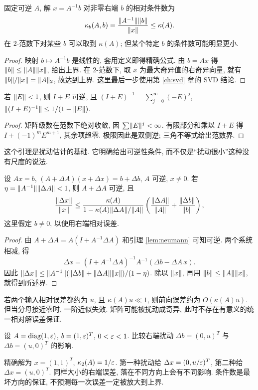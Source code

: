 \begin{proposition}\label{prop:bcondition}
固定可逆 $A$, 解 $x=A^{-1}b$ 对非零右端 $b$ 的相对条件数为
\[
\kappa_b(A,b)=\frac{\lVert A^{-1}\rVert\lVert b\rVert}{\lVert x\rVert}\le\kappa(A).
\]
在 $2$-范数下对某些 $b$ 可以取到 $\kappa(A)$; 但某个特定 $b$ 的条件数可能明显更小.
\end{proposition}
\begin{proof}
映射 $b\mapsto A^{-1}b$ 是线性的, 套用定义即得精确公式. 由 $b=Ax$ 得 $\lVert b\rVert\le\lVert A\rVert\lVert x\rVert$, 给出上界. 在 $2$-范数下, 取 $x$ 为最大奇异值的右奇异向量, 就有 $\lVert b\rVert/\lVert x\rVert=\lVert A\rVert_2$, 故达到上界. 这里最后一步使用第 \ref{ch:svd} 章的 SVD 结论.
\end{proof}
\begin{lemma}[小扰动可逆性]\label{lem:neumann}
若 $\lVert E\rVert<1$, 则 $I+E$ 可逆, 且 $(I+E)^{-1}=\sum_{j=0}^{\infty}(-E)^j$, $\lVert (I+E)^{-1}\rVert\le1/(1-\lVert E\rVert)$.
\end{lemma}
\begin{proof}
矩阵级数在范数下绝对收敛, 因 $\sum\lVert E\rVert^j<\infty$. 有限部分和乘以 $I+E$ 得 $I+(-1)^mE^{m+1}$, 其余项趋零. 极限因此是双侧逆; 三角不等式给出范数界.
\end{proof}
这个引理是扰动估计的基础. 它明确给出可逆性条件, 而不仅是“扰动很小”这种没有尺度的说法.

\begin{theorem}[线性系统扰动界]\label{thm:perturb}
设 $Ax=b$, $(A+\Delta A)(x+\Delta x)=b+\Delta b$, $A$ 可逆, $x\ne0$. 若 $\eta=\lVert A^{-1}\rVert\lVert \Delta A\rVert<1$, 则 $A+\Delta A$ 可逆, 且
\[
\frac{\lVert \Delta x\rVert}{\lVert x\rVert}
\le\frac{\kappa(A)}{1-\kappa(A)\lVert \Delta A\rVert/\lVert A\rVert}
\left(\frac{\lVert \Delta A\rVert}{\lVert A\rVert}+\frac{\lVert \Delta b\rVert}{\lVert b\rVert}\right),
\]
这里假定 $b\ne0$, 以使用右端相对误差.
\end{theorem}
\begin{proof}
由 $A+\Delta A=A(I+A^{-1}\Delta A)$ 和引理 \ref{lem:neumann} 可知可逆. 两个系统相减, 得
\[
\Delta x=(I+A^{-1}\Delta A)^{-1}A^{-1}(\Delta b-\Delta A\,x).
\]
因此 $\lVert \Delta x\rVert\le\lVert A^{-1}\rVert(\lVert \Delta b\rVert+\lVert \Delta A\rVert\lVert x\rVert)/(1-\eta)$. 除以 $\lVert x\rVert$, 再用 $\lVert b\rVert\le\lVert A\rVert\lVert x\rVert$, 就得到所述界.
\end{proof}
若两个输入相对误差都约为 $u$, 且 $\kappa(A)u\ll1$, 则前向误差约为 $O(\kappa(A)u)$. 但当分母接近零时, 一阶近似失效. 矩阵可能被扰动成奇异, 此时不存在有意义的统一相对解误差保证.

\begin{example}
设 $A=\operatorname{diag}(1,\varepsilon)$, $b=(1,\varepsilon)^T$, $0<\varepsilon<1$. 比较右端扰动 $\Delta b=(0,u)^T$ 与 $\Delta b=(u,0)^T$ 的影响.
\end{example}
\begin{solution}
精确解为 $x=(1,1)^T$, $\kappa_2(A)=1/\varepsilon$. 第一种扰动给 $\Delta x=(0,u/\varepsilon)^T$, 第二种给 $\Delta x=(u,0)^T$. 同样大小的右端误差, 落在不同方向上会有不同影响. 条件数是最坏方向的保证, 不预测每一次误差一定被放大到上界.
\end{solution}

